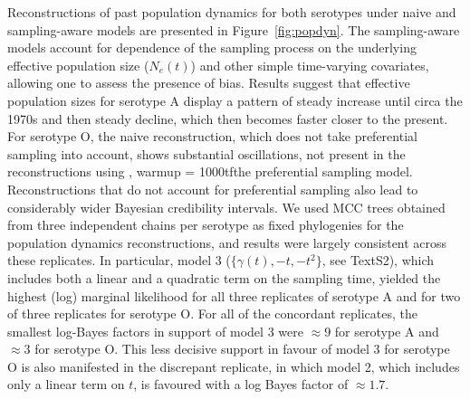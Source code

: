 \documentclass[10pt]{article}
\begin{document}
Reconstructions of past population dynamics for both serotypes under naive and sampling-aware models are presented in Figure~\ref{fig:popdyn}.
The sampling-aware models account for dependence of the sampling process on the underlying effective population size ($N_e(t)$) and other simple time-varying covariates, allowing one to assess the presence of bias.
Results suggest that effective population sizes for serotype A display a pattern of steady increase until circa the 1970s and then steady decline, which then becomes faster closer to the present.
For serotype O, the naive reconstruction, which does not take preferential sampling into account, shows substantial oscillations, not present in the reconstructions using , warmup = 1000tfthe preferential sampling model.
Reconstructions that do not account for preferential sampling also lead to considerably wider Bayesian credibility intervals.
We used MCC trees obtained from three independent chains per serotype as fixed phylogenies for the population dynamics reconstructions, and results were largely consistent across these replicates. %
In particular, model 3 ($\{\gamma(t), -t, -t^2\}$, see TextS2), which includes both a linear and a quadratic term on the sampling time, yielded the highest (log) marginal likelihood for all three replicates of serotype A and for two of three replicates for serotype O.
For all of the concordant replicates, the smallest log-Bayes factors in support of model 3 were $\approx 9$ for serotype A and $\approx 3$ for serotype O.
This less decisive support in favour of model 3 for serotype O is also manifested in the discrepant replicate, in which model 2, which includes only a linear term on $t$, is favoured with a log Bayes factor of $\approx 1.7$. %
\end{document}
